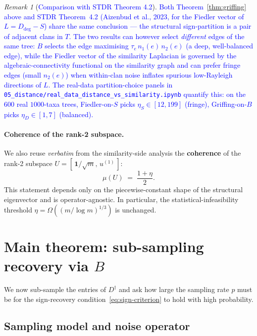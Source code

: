 \documentclass[11pt]{article}
\newcommand{\new}[1]{\textcolor{blue}{#1}}
\theoremstyle{remark}
\newtheorem*{remark}{Remark}
\newcommand{\1}{\mathbf{1}}
\newcommand{\Ddeg}{D_{\mathrm{deg}}}
\newcommand{\Ddist}{D^{\dagger}}      %
\newcommand{\Bop}{B}
\begin{document}
\begin{remark}[\new{Comparison with STDR Theorem 4.2}]
\new{Both Theorem~\ref{thm:griffing} above and STDR Theorem~4.2
(Aizenbud et al., 2023, for the Fiedler vector of $L = \Ddeg - S$)
share the same conclusion --- the structural sign-partition is a pair of
adjacent clans in $T$. The two results can however select \emph{different}
edges of the same tree: $\Bop$ selects the edge maximising
$\tau_{e}\,n_{1}(e)\,n_{2}(e)$ (a deep, well-balanced edge), while the
Fiedler vector of the similarity Laplacian is governed by the
algebraic-connectivity functional on the similarity graph and can
prefer fringe edges (small $n_{2}(e)$) when within-clan noise inflates
spurious low-Rayleigh directions of $L$. The real-data partition-choice
panels in \texttt{05\_distance/real\_data\_distance\_vs\_similarity.ipynb}
quantify this: on the 600 real $1000$-taxa trees, Fiedler-on-$S$ picks
$\eta_{S} \in [12, 199]$ (fringe), Griffing-on-$\Bop$ picks
$\eta_{D} \in [1, 7]$ (balanced).}
\end{remark}

\paragraph{Coherence of the rank-2 subspace.}
We also reuse \emph{verbatim} from the similarity-side analysis the
\textbf{coherence} of the rank-2 subspace $U = [\,\1/\sqrt m,\, u^{(1)}\,]$:
\begin{equation}
  \mu(U) \;=\; \frac{1 + \eta}{2}.
\end{equation}
This statement depends only on the piecewise-constant shape of the
structural eigenvector and is operator-agnostic.  In particular, the
statistical-infeasibility threshold $\eta = \Omega((m/\log m)^{1/3})$ is
unchanged.

\section{Main theorem: sub-sampling recovery via \texorpdfstring{$\Bop$}{B}}
\label{sec:main}

We now sub-sample the entries of $\Ddist$ and ask how large the sampling
rate $p$ must be for the sign-recovery condition~\eqref{eq:sign-criterion}
to hold with high probability.

\subsection{Sampling model and noise operator}
\label{sec:noise}
\end{document}
